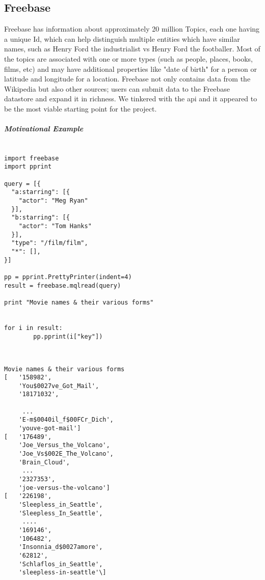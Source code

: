 \documentclass[12pt]{article}
\begin{document}
\subsection{Freebase} 
Freebase has information about approximately 20 million Topics, each one having a
unique Id, which can help distinguish multiple entities which have similar names,
such as Henry Ford the industrialist vs Henry Ford the footballer. Most of the
topics are associated with one or more types\cite{freebasetype} (such as
people, places, books, films, etc) and may have additional properties like "date of birth" for a person
or latitude and longitude for a location. Freebase not only contains data from
the Wikipedia but also other sources; users can submit data to the Freebase
datastore and expand it in richness. We tinkered with the api\cite{freebaseapi}
and it appeared to be the most viable starting point for the project.

\subparagraph{Motivational Example}

\begin{lstlisting}[label=some-code,caption=Minimal code to Freebase]

import freebase
import pprint

query = [{
  "a:starring": [{
    "actor": "Meg Ryan"                                                       
  }],
  "b:starring": [{                                                            
    "actor": "Tom Hanks"
  }],
  "type": "/film/film",
  "*": [],
}]  
    
pp = pprint.PrettyPrinter(indent=4)
result = freebase.mqlread(query)
    
print "Movie names & their various forms"
    
    
for i in result:                                                              
        pp.pprint(i["key"])                                                   
                
\end{lstlisting}
\begin{lstlisting}[label=output,caption=Cleaned Output]

Movie names & their various forms
[   '158982',
    'You$0027ve_Got_Mail',
    '18171032',

     ...
    'E-m$0040il_f$00FCr_Dich',
    'youve-got-mail']
[   '176489',
    'Joe_Versus_the_Volcano',
    'Joe_Vs$002E_The_Volcano',
    'Brain_Cloud',
     ...
    '2327353',
    'joe-versus-the-volcano']
[   '226198',
    'Sleepless_in_Seattle',
    'Sleepless_In_Seattle',
     ....
    '169146',
    '106482',
    'Insonnia_d$0027amore',
    '62812',
    'Schlaflos_in_Seattle',
    'sleepless-in-seattle'\]

\end{lstlisting}
\end{document}
